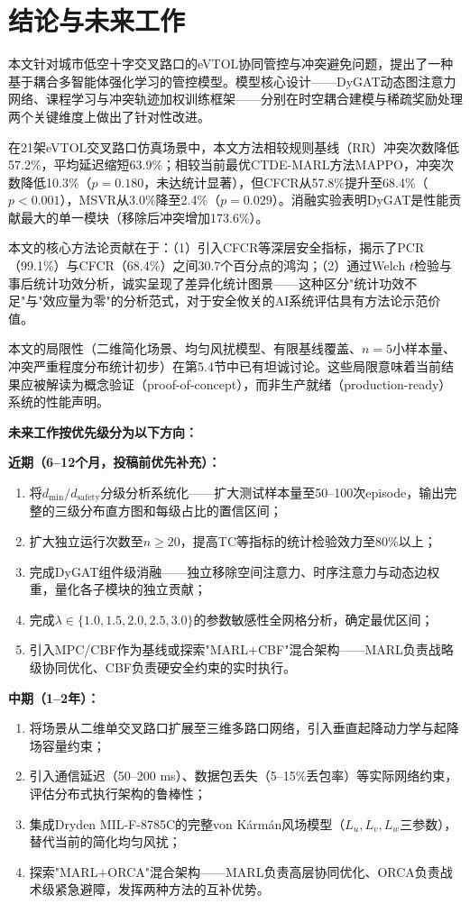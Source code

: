\documentclass[12pt,a4paper,UTF8]{ctexart}
\begin{document}
\section{结论与未来工作}

本文针对城市低空十字交叉路口的eVTOL协同管控与冲突避免问题，提出了一种基于耦合多智能体强化学习的管控模型。模型核心设计——DyGAT动态图注意力网络、课程学习与冲突轨迹加权训练框架——分别在时空耦合建模与稀疏奖励处理两个关键维度上做出了针对性改进。

在21架eVTOL交叉路口仿真场景中，本文方法相较规则基线（RR）冲突次数降低57.2\%，平均延迟缩短63.9\%；相较当前最优CTDE-MARL方法MAPPO，冲突次数降低10.3\%（$p=0.180$，未达统计显著），但CFCR从57.8\%提升至68.4\%（$p<0.001$），MSVR从3.0\%降至2.4\%（$p=0.029$）。消融实验表明DyGAT是性能贡献最大的单一模块（移除后冲突增加173.6\%）。

本文的核心方法论贡献在于：（1）引入CFCR等深层安全指标，揭示了PCR（99.1\%）与CFCR（68.4\%）之间30.7个百分点的鸿沟；（2）通过Welch $t$检验与事后统计功效分析，诚实呈现了差异化统计图景——这种区分"统计功效不足"与"效应量为零"的分析范式，对于安全攸关的AI系统评估具有方法论示范价值。

本文的局限性（二维简化场景、均匀风扰模型、有限基线覆盖、$n=5$小样本量、冲突严重程度分布统计初步）在第5.4节中已有坦诚讨论。这些局限意味着当前结果应被解读为概念验证（proof-of-concept），而非生产就绪（production-ready）系统的性能声明。

\textbf{未来工作按优先级分为以下方向：}

\textbf{近期（6--12个月，投稿前优先补充）：}
\begin{enumerate}[label=(\arabic*)]
    \item 将$d_{\min}/d_{\text{safety}}$分级分析系统化——扩大测试样本量至50--100次episode，输出完整的三级分布直方图和每级占比的置信区间；
    \item 扩大独立运行次数至$n \geq 20$，提高TC等指标的统计检验效力至80\%以上；
    \item 完成DyGAT组件级消融——独立移除空间注意力、时序注意力与动态边权重，量化各子模块的独立贡献；
    \item 完成$\lambda \in \{1.0, 1.5, 2.0, 2.5, 3.0\}$的参数敏感性全网格分析，确定最优区间；
    \item 引入MPC/CBF作为基线或探索"MARL$+$CBF"混合架构——MARL负责战略级协同优化、CBF负责硬安全约束的实时执行。
\end{enumerate}

\textbf{中期（1--2年）：}
\begin{enumerate}[label=(\arabic*), resume]
    \item 将场景从二维单交叉路口扩展至三维多路口网络，引入垂直起降动力学与起降场容量约束；
    \item 引入通信延迟（50--200 ms）、数据包丢失（5--15\%丢包率）等实际网络约束，评估分布式执行架构的鲁棒性；
    \item 集成Dryden MIL-F-8785C的完整von K\'{a}rm\'{a}n风场模型（$L_u, L_v, L_w$三参数），替代当前的简化均匀风扰；
    \item 探索"MARL$+$ORCA"混合架构——MARL负责高层协同优化、ORCA负责战术级紧急避障，发挥两种方法的互补优势。
\end{enumerate}
\end{document}
